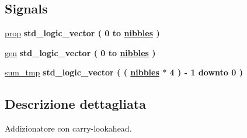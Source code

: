 \subsection*{Signals}
 \begin{DoxyCompactItemize}
\item 
\hyperlink{group___carry_loockahead_ga19afe0b89973d7fc29362431f2e828b7}{prop} {\bfseries \textcolor{vhdlchar}{std\+\_\+logic\+\_\+vector}\textcolor{vhdlchar}{ }\textcolor{vhdlchar}{(}\textcolor{vhdlchar}{ }\textcolor{vhdlchar}{ } \textcolor{vhdldigit}{0} \textcolor{vhdlchar}{ }\textcolor{vhdlchar}{to}\textcolor{vhdlchar}{ }\textcolor{vhdlchar}{ }\textcolor{vhdlchar}{ }\textcolor{vhdlchar}{ }{\bfseries \hyperlink{group___carry_loockahead_ga0b63b586531492d0fa882246cca071c1}{nibbles}} \textcolor{vhdlchar}{ }\textcolor{vhdlchar}{)}\textcolor{vhdlchar}{ }} 
\item 
\hyperlink{group___carry_loockahead_ga7a68948b7b96c7b51036939fad8e71b3}{gen} {\bfseries \textcolor{vhdlchar}{std\+\_\+logic\+\_\+vector}\textcolor{vhdlchar}{ }\textcolor{vhdlchar}{(}\textcolor{vhdlchar}{ }\textcolor{vhdlchar}{ } \textcolor{vhdldigit}{0} \textcolor{vhdlchar}{ }\textcolor{vhdlchar}{to}\textcolor{vhdlchar}{ }\textcolor{vhdlchar}{ }\textcolor{vhdlchar}{ }\textcolor{vhdlchar}{ }{\bfseries \hyperlink{group___carry_loockahead_ga0b63b586531492d0fa882246cca071c1}{nibbles}} \textcolor{vhdlchar}{ }\textcolor{vhdlchar}{)}\textcolor{vhdlchar}{ }} 
\item 
\hyperlink{group___carry_loockahead_ga3c7f619aa6449e06bf0dd48a7db92b84}{sum\+\_\+tmp} {\bfseries \textcolor{vhdlchar}{std\+\_\+logic\+\_\+vector}\textcolor{vhdlchar}{ }\textcolor{vhdlchar}{(}\textcolor{vhdlchar}{ }\textcolor{vhdlchar}{(}\textcolor{vhdlchar}{ }\textcolor{vhdlchar}{ }\textcolor{vhdlchar}{ }\textcolor{vhdlchar}{ }{\bfseries \hyperlink{group___carry_loockahead_ga0b63b586531492d0fa882246cca071c1}{nibbles}} \textcolor{vhdlchar}{$\ast$}\textcolor{vhdlchar}{ } \textcolor{vhdldigit}{4} \textcolor{vhdlchar}{ }\textcolor{vhdlchar}{)}\textcolor{vhdlchar}{ }\textcolor{vhdlchar}{-\/}\textcolor{vhdlchar}{ } \textcolor{vhdldigit}{1} \textcolor{vhdlchar}{ }\textcolor{vhdlchar}{downto}\textcolor{vhdlchar}{ }\textcolor{vhdlchar}{ } \textcolor{vhdldigit}{0} \textcolor{vhdlchar}{ }\textcolor{vhdlchar}{)}\textcolor{vhdlchar}{ }} 
\end{DoxyCompactItemize}


\subsection{Descrizione dettagliata}
Addizionatore con carry-\/lookahead. 



